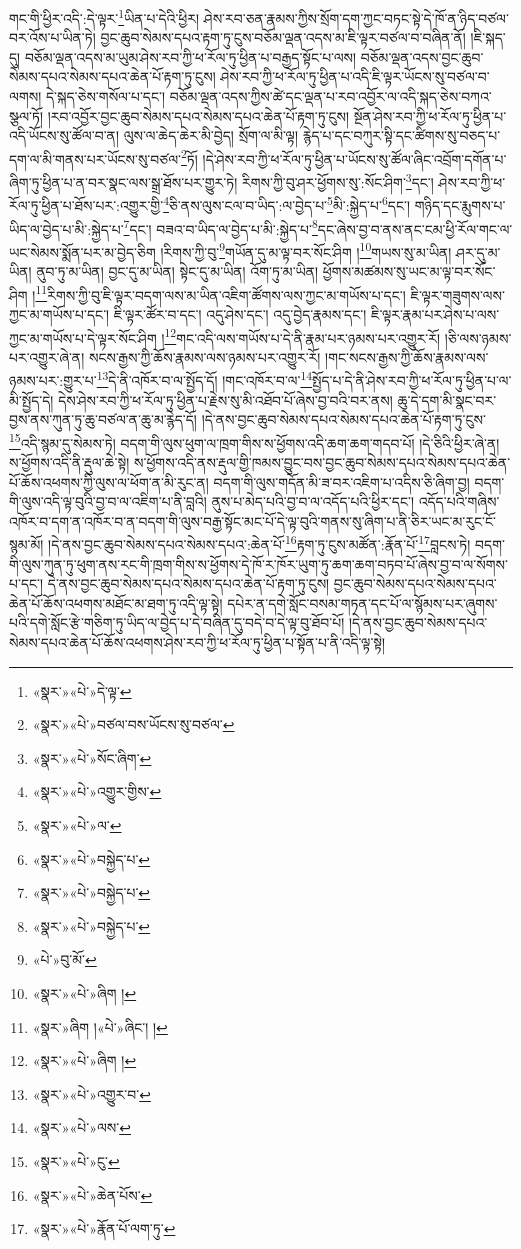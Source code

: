 གང་གི་ཕྱིར་འདི་:དེ་ལྟར་\footnote{«སྣར་»«པེ་»དེ་ལྟ་}ཡིན་པ་དེའི་ཕྱིར། ཤེས་རབ་ཅན་རྣམས་ཀྱིས་སྲོག་དག་ཀྱང་བཏང་སྟེ་དེ་ཁོ་ན་ཉིད་བཙལ་བར་འོས་པ་ཡིན་ཏེ། བྱང་ཆུབ་སེམས་དཔའ་རྟག་ཏུ་ངུས་བཅོམ་ལྡན་འདས་མ་ཇི་ལྟར་བཙལ་བ་བཞིན་ནོ། །ཇི་སྐད་དུ། བཅོམ་ལྡན་འདས་མ་ཡུམ་ཤེས་རབ་ཀྱི་ཕ་རོལ་ཏུ་ཕྱིན་པ་བརྒྱད་སྟོང་པ་ལས། བཅོམ་ལྡན་འདས་བྱང་ཆུབ་སེམས་དཔའ་སེམས་དཔའ་ཆེན་པོ་རྟག་ཏུ་ངུས། ཤེས་རབ་ཀྱི་ཕ་རོལ་ཏུ་ཕྱིན་པ་འདི་ཇི་ལྟར་ཡོངས་སུ་བཙལ་བ་ལགས། དེ་སྐད་ཅེས་གསོལ་པ་དང་། བཅོམ་ལྡན་འདས་ཀྱིས་ཚེ་དང་ལྡན་པ་རབ་འབྱོར་ལ་འདི་སྐད་ཅེས་བཀའ་སྩལ་ཏོ། །རབ་འབྱོར་བྱང་ཆུབ་སེམས་དཔའ་སེམས་དཔའ་ཆེན་པོ་རྟག་ཏུ་ངུས། སྔོན་ཤེས་རབ་ཀྱི་ཕ་རོལ་ཏུ་ཕྱིན་པ་འདི་ཡོངས་སུ་ཚོལ་བ་ན། ལུས་ལ་ཆེད་ཆེར་མི་བྱེད། སྲོག་ལ་མི་ལྟ། རྙེད་པ་དང་བཀུར་སྟི་དང་ཚིགས་སུ་བཅད་པ་དག་ལ་མི་གནས་པར་ཡོངས་སུ་བཙལ་\footnote{«སྣར་»«པེ་»བཙལ་བས་ཡོངས་སུ་བཙལ་}ཏོ། །དེ་ཤེས་རབ་ཀྱི་ཕ་རོལ་ཏུ་ཕྱིན་པ་ཡོངས་སུ་ཚོལ་ཞིང་འབྲོག་དགོན་པ་ཞིག་ཏུ་ཕྱིན་པ་ན་བར་སྣང་ལས་སྒྲ་ཐོས་པར་གྱུར་ཏེ། རིགས་ཀྱི་བུ་ཤར་ཕྱོགས་སུ་:སོང་ཤིག་\footnote{«སྣར་»«པེ་»སོང་ཞིག་}དང་། ཤེས་རབ་ཀྱི་ཕ་རོལ་ཏུ་ཕྱིན་པ་ཐོས་པར་:འགྱུར་གྱི་\footnote{«སྣར་»«པེ་»འགྱུར་གྱིས་}ཅི་ནས་ལུས་ངལ་བ་ཡིད་:ལ་བྱེད་པ་\footnote{«སྣར་»«པེ་»ལ་}མི་:སྐྱེད་པ་\footnote{«སྣར་»«པེ་»བསྐྱེད་པ་}དང་། གཉིད་དང་རྨུགས་པ་ཡིད་ལ་བྱེད་པ་མི་:སྐྱེད་པ་\footnote{«སྣར་»«པེ་»བསྐྱེད་པ་}དང་། བཟའ་བ་ཡིད་ལ་བྱེད་པ་མི་:སྐྱེད་པ་\footnote{«སྣར་»«པེ་»བསྐྱེད་པ་}དང་ཞེས་བྱ་བ་ནས་ནང་ངམ་ཕྱི་རོལ་གང་ལ་ཡང་སེམས་སྨོན་པར་མ་བྱེད་ཅིག །རིགས་ཀྱི་བུ་\footnote{«པེ་»བུ་མོ་}གཡོན་དུ་མ་ལྟ་བར་སོང་ཤིག །\footnote{«སྣར་»«པེ་»ཞིག །}གཡས་སུ་མ་ཡིན། ཤར་དུ་མ་ཡིན། ནུབ་ཏུ་མ་ཡིན། བྱང་དུ་མ་ཡིན། སྟེང་དུ་མ་ཡིན། འོག་ཏུ་མ་ཡིན། ཕྱོགས་མཚམས་སུ་ཡང་མ་ལྟ་བར་སོང་ཤིག །\footnote{«སྣར་»ཞིག །«པེ་»ཞིང་། །}རིགས་ཀྱི་བུ་ཇི་ལྟར་བདག་ལས་མ་ཡིན་འཇིག་ཚོགས་ལས་ཀྱང་མ་གཡོས་པ་དང་། ཇི་ལྟར་གཟུགས་ལས་ཀྱང་མ་གཡོས་པ་དང་། ཇི་ལྟར་ཚོར་བ་དང་། འདུ་ཤེས་དང་། འདུ་བྱེད་རྣམས་དང་། ཇི་ལྟར་རྣམ་པར་ཤེས་པ་ལས་ཀྱང་མ་གཡོས་པ་དེ་ལྟར་སོང་ཤིག །\footnote{«སྣར་»«པེ་»ཞིག །}གང་འདི་ལས་གཡོས་པ་དེ་ནི་རྣམ་པར་ཉམས་པར་འགྱུར་རོ། །ཅི་ལས་ཉམས་པར་འགྱུར་ཞེ་ན། སངས་རྒྱས་ཀྱི་ཆོས་རྣམས་ལས་ཉམས་པར་འགྱུར་རོ། །གང་སངས་རྒྱས་ཀྱི་ཆོས་རྣམས་ལས་ཉམས་པར་:གྱུར་པ་\footnote{«སྣར་»«པེ་»འགྱུར་བ་}དེ་ནི་འཁོར་བ་ལ་སྤྱོད་དོ། །གང་འཁོར་བ་ལ་\footnote{«སྣར་»«པེ་»ལས་}སྤྱོད་པ་དེ་ནི་ཤེས་རབ་ཀྱི་ཕ་རོལ་ཏུ་ཕྱིན་པ་ལ་མི་སྤྱོད་དེ། དེས་ཤེས་རབ་ཀྱི་ཕ་རོལ་ཏུ་ཕྱིན་པ་རྗེས་སུ་མི་འཐོབ་པོ་ཞེས་བྱ་བའི་བར་ནས། ཆུ་དེ་དག་མི་སྣང་བར་བྱས་ནས་ཀུན་ཏུ་ཆུ་བཙལ་ན་ཆུ་མ་རྙེད་དོ། །དེ་ནས་བྱང་ཆུབ་སེམས་དཔའ་སེམས་དཔའ་ཆེན་པོ་རྟག་ཏུ་ངུས་\footnote{«སྣར་»«པེ་»ངུ་}འདི་སྙམ་དུ་སེམས་ཏེ། བདག་གི་ལུས་ཕུག་ལ་ཁྲག་གིས་ས་ཕྱོགས་འདི་ཆག་ཆག་གདབ་པོ། །དེ་ཅིའི་ཕྱིར་ཞེ་ན། ས་ཕྱོགས་འདི་ནི་རྡུལ་ཆེ་སྟེ། ས་ཕྱོགས་འདི་ནས་རྡུལ་གྱི་ཁམས་བྱུང་བས་བྱང་ཆུབ་སེམས་དཔའ་སེམས་དཔའ་ཆེན་པོ་ཆོས་འཕགས་ཀྱི་ལུས་ལ་ཕོག་ན་མི་རུང་ན། བདག་གི་ལུས་གདོན་མི་ཟ་བར་འཇིག་པ་འདིས་ཅི་ཞིག་བྱ། བདག་གི་ལུས་འདི་ལྟ་བུའི་བྱ་བ་ལ་འཇིག་པ་ནི་བླའི། ནུས་པ་མེད་པའི་བྱ་བ་ལ་འདོད་པའི་ཕྱིར་དང་། འདོད་པའི་གཞིས་འཁོར་བ་དག་ན་འཁོར་བ་ན་བདག་གི་ལུས་བརྒྱ་སྟོང་མང་པོ་དེ་ལྟ་བུའི་གནས་སུ་ཞིག་པ་ནི་ཅིར་ཡང་མ་རུང་ངོ་སྙམ་མོ། །དེ་ནས་བྱང་ཆུབ་སེམས་དཔའ་སེམས་དཔའ་:ཆེན་པོ་\footnote{«སྣར་»«པེ་»ཆེན་པོས་}རྟག་ཏུ་ངུས་མཚོན་:རྣོན་པོ་\footnote{«སྣར་»«པེ་»རྣོན་པོ་ལག་ཏུ་}བླངས་ཏེ། བདག་གི་ལུས་ཀུན་ཏུ་ཕུག་ནས་རང་གི་ཁྲག་གིས་ས་ཕྱོགས་དེ་ཁོ་ར་ཁོར་ཡུག་ཏུ་ཆག་ཆག་བཏབ་པོ་ཞེས་བྱ་བ་ལ་སོགས་པ་དང་། དེ་ནས་བྱང་ཆུབ་སེམས་དཔའ་སེམས་དཔའ་ཆེན་པོ་རྟག་ཏུ་ངུས། བྱང་ཆུབ་སེམས་དཔའ་སེམས་དཔའ་ཆེན་པོ་ཆོས་འཕགས་མཐོང་མ་ཐག་ཏུ་འདི་ལྟ་སྟེ། དཔེར་ན་དགེ་སློང་བསམ་གཏན་དང་པོ་ལ་སྙོམས་པར་ཞུགས་པའི་དགེ་སློང་རྩེ་གཅིག་ཏུ་ཡིད་ལ་བྱེད་པ་དེ་བཞིན་དུ་བདེ་བ་དེ་ལྟ་བུ་ཐོབ་པོ། །དེ་ནས་བྱང་ཆུབ་སེམས་དཔའ་སེམས་དཔའ་ཆེན་པོ་ཆོས་འཕགས་ཤེས་རབ་ཀྱི་ཕ་རོལ་ཏུ་ཕྱིན་པ་སྟོན་པ་ནི་འདི་ལྟ་སྟེ། 